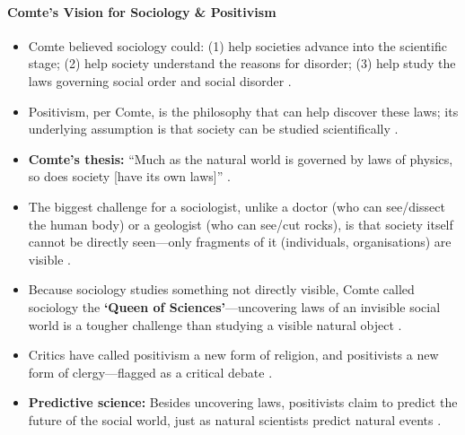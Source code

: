 \paragraph{Comte's Vision for Sociology \& Positivism}
\begin{itemize}
    \item Comte believed sociology could: (1) help societies advance into the scientific stage; (2) help society understand the reasons for disorder; (3) help study the laws governing social order and social disorder .
    \item Positivism, per Comte, is the philosophy that can help discover these laws; its underlying assumption is that society can be studied scientifically .
\end{itemize}

\begin{KeyConcept}
\begin{itemize}
    \item \textbf{Comte's thesis:} ``Much as the natural world is governed by laws of physics, so does society [have its own laws]'' .
    \item The biggest challenge for a sociologist, unlike a doctor (who can see/dissect the human body) or a geologist (who can see/cut rocks), is that society itself cannot be directly seen---only fragments of it (individuals, organisations) are visible .
\end{itemize}
\end{KeyConcept}

\begin{CriticalPoint}
\begin{itemize}
    \item Because sociology studies something not directly visible, Comte called sociology the \textbf{`Queen of Sciences'}---uncovering laws of an invisible social world is a tougher challenge than studying a visible natural object .
    \item Critics have called positivism a new form of religion, and positivists a new form of clergy---flagged as a critical debate .
    \item \textbf{Predictive science:} Besides uncovering laws, positivists claim to predict the future of the social world, just as natural scientists predict natural events .
\end{itemize}
\end{CriticalPoint}

